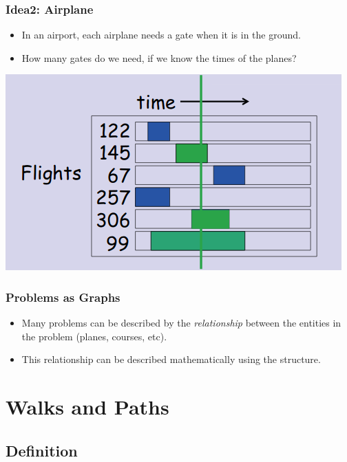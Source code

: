 \documentclass{beamer}
\begin{document}
\begin{frame}
  \frametitle{Idea2: Airplane}

  \begin{itemize}
    \item In an airport, each airplane needs a gate when it is in
    the ground.
    \item How many gates do we need, if we know the times of the planes?
  \end{itemize}
  \bigskip

  \centering
  \includegraphics[width=.8\textwidth]{../img/gatetable}
\end{frame}

\begin{frame}
  \frametitle{Problems as Graphs}
  \begin{itemize}
    \item Many problems can be described by the \emph{relationship}
    between the entities in the problem (planes, courses, etc).
    \bigskip

    \item This relationship can be described mathematically using the
     structure.
  \end{itemize}
\end{frame}

\section{Walks and Paths}
\subsection{Definition}
\end{document}
